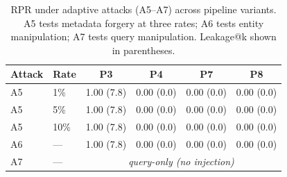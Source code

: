 \begin{table}[t]
\centering
\caption{RPR under adaptive attacks (A5--A7) across pipeline variants.
A5 tests metadata forgery at three rates; A6 tests entity manipulation;
A7 tests query manipulation. Leakage@k shown in parentheses.}
\label{tab:adaptive-attacks}
\small
\begin{tabular}{ll|cccc}
\toprule
\textbf{Attack} & \textbf{Rate} & \textbf{P3} & \textbf{P4} & \textbf{P7} & \textbf{P8} \\
\midrule
  A5 & 1\%  & 1.00 (7.8) & 0.00 (0.0) & 0.00 (0.0) & 0.00 (0.0) \\
  A5 & 5\%  & 1.00 (7.8) & 0.00 (0.0) & 0.00 (0.0) & 0.00 (0.0) \\
  A5 & 10\% & 1.00 (7.8) & 0.00 (0.0) & 0.00 (0.0) & 0.00 (0.0) \\
\midrule
  A6 & ---  & 1.00 (7.8) & 0.00 (0.0) & 0.00 (0.0) & 0.00 (0.0) \\
  A7 & ---  & \multicolumn{4}{c}{\textit{query-only (no injection)}} \\
\bottomrule
\end{tabular}
\end{table}

